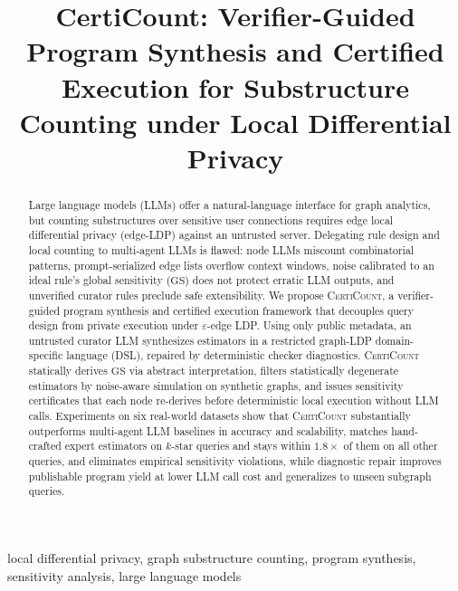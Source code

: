 \documentclass[conference]{IEEEtran}
\theoremstyle{ieeeitalic}
\newcommand{\GS}{\mathrm{GS}}
\begin{document}

\title{CertiCount: Verifier-Guided Program Synthesis and Certified Execution for Substructure Counting under Local Differential Privacy}

\author{
}

\maketitle

\begin{abstract}
Large language models (LLMs) offer a natural-language interface for graph analytics, but counting substructures over sensitive user connections requires edge local differential privacy (edge-LDP) against an untrusted server. Delegating rule design and local counting to multi-agent LLMs is flawed: node LLMs miscount combinatorial patterns, prompt-serialized edge lists overflow context windows, noise calibrated to an ideal rule's global sensitivity ($\GS$) does not protect erratic LLM outputs, and unverified curator rules preclude safe extensibility. We propose \textsc{CertiCount}, a verifier-guided program synthesis and certified execution framework that decouples query design from private execution under $\varepsilon$-edge LDP. Using only public metadata, an untrusted curator LLM synthesizes estimators in a restricted graph-LDP domain-specific language (DSL), repaired by deterministic checker diagnostics. \textsc{CertiCount} statically derives $\GS$ via abstract interpretation, filters statistically degenerate estimators by noise-aware simulation on synthetic graphs, and issues sensitivity certificates that each node re-derives before deterministic local execution without LLM calls. Experiments on six real-world datasets show that \textsc{CertiCount} substantially outperforms multi-agent LLM baselines in accuracy and scalability, matches hand-crafted expert estimators on $k$-star queries and stays within $1.8\times$ of them on all other queries, and eliminates empirical sensitivity violations, while diagnostic repair improves publishable program yield at lower LLM call cost and generalizes to unseen subgraph queries.
\end{abstract}

\begin{IEEEkeywords}
local differential privacy, graph substructure counting, program synthesis, sensitivity analysis, large language models
\end{IEEEkeywords}
\end{document}

